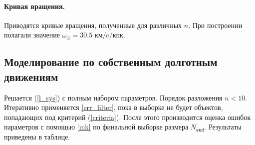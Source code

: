 \documentclass{matmex-diploma-custom}
\begin{document}
\pagebreak
\paragraph{Кривая вращения.} Приводятся кривые вращения, полученные для различных $n$. При построении полагали значение $\omega_{\odot} = 30.5$ км/c/кпк.

\pagebreak
\subsection{Моделирование по собственным долготным движениям}
Решается (\ref{l_sys}) с полным набором параметров. Порядок разложения $n < 10$. Итеративно применяется \ref{err_filter}, пока в выборке не будет объектов, попадающих под критерий (\ref{criteria}). После этого производится оценка ошибок параметров с помощью \ref{mk} по финальной выборке размера $N_{\texttt{end}}$. Результаты приведены в таблице. 
\end{document}
